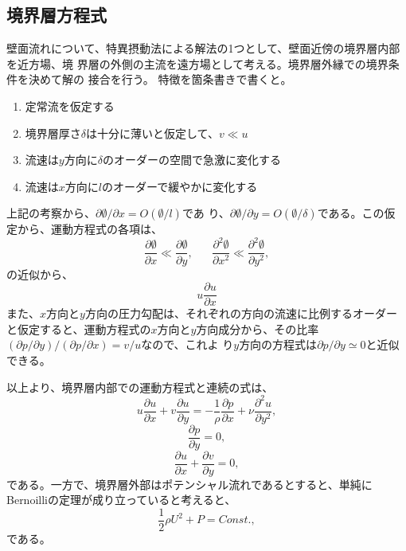 \subsection{境界層方程式}

壁面流れについて、特異摂動法による解法の1つとして、壁面近傍の境界層内部を近方場、境
界層の外側の主流を遠方場として考える。境界層外縁での境界条件を決めて解の
接合を行う。
特徴を箇条書きで書くと。
\begin{enumerate}
 \item 定常流を仮定する
 \item 境界層厚さ$\delta$は十分に薄いと仮定して、$v\ll u$
 \item 流速は$y$方向に$\delta$のオーダーの空間で急激に変化する
 \item 流速は$x$方向に$l$のオーダーで緩やかに変化する
\end{enumerate}
上記の考察から、$\partial\emptyset/\partial x = O(\emptyset/l)$であ
り、$\partial\emptyset/\partial y = O (\emptyset/\delta)$である。この仮
定から、運動方程式の各項は、
\begin{equation}
 \frac{\partial\emptyset}{\partial x} \ll
  \frac{\partial\emptyset}{\partial y}, \mspace{30mu}
 \frac{\partial^2\emptyset}{\partial x^2} \ll
  \frac{\partial^2\emptyset}{\partial y^2}, 
\end{equation}
の近似から、
\begin{equation}
 u\frac{\partial u}{\partial x}
\end{equation}
また、$x$方向と$y$方向の圧力勾配は、それぞれの方向の流速に比例するオーダー
と仮定すると、運動方程式の$x$方向と$y$方向成分から、その比率
$(\partial p/\partial y)/(\partial p/\partial x) = v / u$なので、これよ
り$y$方向の方程式は$\partial p/\partial y \simeq 0$と近似できる。

以上より、境界層内部での運動方程式と連続の式は、
\begin{equation}
 u\frac{\partial u}{\partial x}
 + v\frac{\partial u}{\partial y}
 = -\frac{1}{\rho}\frac{\partial p}{\partial x}
 + \nu \frac{\partial^2u}{\partial y^2},
\end{equation}
\begin{equation}
 \frac{\partial p}{\partial y} = 0,
\end{equation}
\begin{equation}
 \frac{\partial u}{\partial x}
  + \frac{\partial v}{\partial y}
  = 0,
\end{equation}
である。一方で、境界層外部はポテンシャル流れであるとすると、単純に
Bernoilliの定理が成り立っていると考えると、
\begin{equation}
 \frac{1}{2}\rho U^2 + P = Const.,
\end{equation}
である。

